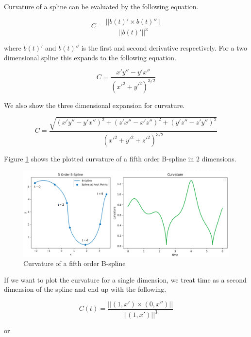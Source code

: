 \documentclass{article}
\begin{document}
Curvature of a spline can be evaluated by the following equation.

\begin{equation} \label{curvature}
    C = \frac{||b(t)' \times b(t)''||} {||b(t)'||^3}
\end{equation}

where \(b(t)'\) and \(b(t)''\) is the first and second derivative respectively. For a two dimensional spline this expands to the following equation.

\begin{equation}
    C = \frac{x'y'' - y'x''}{(x'^2 + y'^2)^{3/2}}
\end{equation}

We also show the three dimensional expansion for curvature.

\begin{equation}
    C = \frac{\sqrt{(x'y'' - y'x'')^2 + (z'x'' - x'z'')^2 + (y'z'' - z'y'')^2}}{(x'^2 + y'^2 + z'^2)^{3/2}}
\end{equation}

Figure \ref{Fig:SplineCurvature} shows the plotted curvature of a fifth order B-spline in 2 dimensions. 

\begin{figure}[H]
\begin{center}
\includegraphics[scale=.23]{SplineCurvature.png}
\end{center}
\caption{Curvature of a fifth order B-spline}
\label{Fig:SplineCurvature}
\end{figure}

If we want to plot the curvature for a single dimension, we treat time as a second dimension of the spline and end up with the following.

\begin{equation}
    C(t) = \frac{||(1,x') \times (0,x'')||}{||(1,x')||^{3}} 
\end{equation}

or
\end{document}
